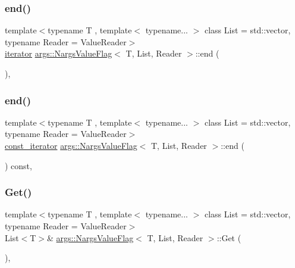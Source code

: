 \subsubsection{\texorpdfstring{end()}{end()}\hspace{0.1cm}{\footnotesize\ttfamily [1/2]}}
{\footnotesize\ttfamily template$<$typename T , template$<$ typename... $>$ class List = std\+::vector, typename Reader  = Value\+Reader$>$ \\
\hyperlink{classargs_1_1_nargs_value_flag_aeaf17e645a109333204dcb7c954a2473}{iterator} \hyperlink{classargs_1_1_nargs_value_flag}{args\+::\+Nargs\+Value\+Flag}$<$ T, List, Reader $>$\+::end (\begin{DoxyParamCaption}{ }\end{DoxyParamCaption})\hspace{0.3cm}{\ttfamily [inline]}, {\ttfamily [noexcept]}}

\mbox{\label{classargs_1_1_nargs_value_flag_acf5a2440b856c875834abbaf88b8782f}} 
\subsubsection{\texorpdfstring{end()}{end()}\hspace{0.1cm}{\footnotesize\ttfamily [2/2]}}
{\footnotesize\ttfamily template$<$typename T , template$<$ typename... $>$ class List = std\+::vector, typename Reader  = Value\+Reader$>$ \\
\hyperlink{classargs_1_1_nargs_value_flag_a115760faf263d007148b30c99d8e6bdc}{const\+\_\+iterator} \hyperlink{classargs_1_1_nargs_value_flag}{args\+::\+Nargs\+Value\+Flag}$<$ T, List, Reader $>$\+::end (\begin{DoxyParamCaption}{ }\end{DoxyParamCaption}) const\hspace{0.3cm}{\ttfamily [inline]}, {\ttfamily [noexcept]}}

\mbox{\label{classargs_1_1_nargs_value_flag_ad9789e398db1944fc641153c8742e2c6}} 
\subsubsection{\texorpdfstring{Get()}{Get()}}
{\footnotesize\ttfamily template$<$typename T , template$<$ typename... $>$ class List = std\+::vector, typename Reader  = Value\+Reader$>$ \\
List$<$T$>$\& \hyperlink{classargs_1_1_nargs_value_flag}{args\+::\+Nargs\+Value\+Flag}$<$ T, List, Reader $>$\+::Get (\begin{DoxyParamCaption}{ }\end{DoxyParamCaption})\hspace{0.3cm}{\ttfamily [inline]}, {\ttfamily [noexcept]}}

